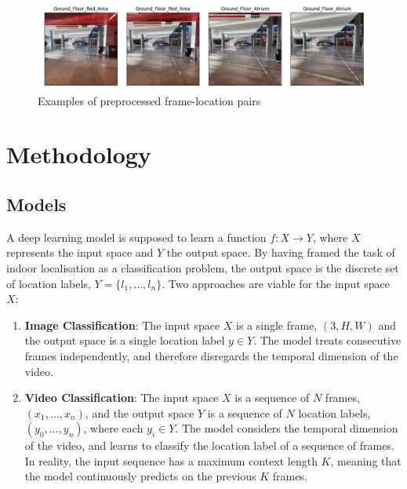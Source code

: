 \documentclass[a4paper]{article}
\begin{document}
  \begin{figure}[ht]
    \centering
    \includegraphics[width=\linewidth]{figures/data-example-batch.jpg}
    \caption{Examples of preprocessed frame-location pairs}
    \label{fig:preprocessed-data}
  \end{figure}

  
  

  \section{Methodology} %
  \label{sec:methodology}


  \subsection{Models} %
  \label{sub:models}

  A deep learning model is supposed to learn a function $f: X \rightarrow Y$,
  where $X$ represents the input space and $Y$ the output space. By having
  framed the task of indoor localisation as a classification problem, the output
  space is the discrete set of location labels, $Y = \{l_1, \ldots, l_n\}$.
  Two approaches are viable for the input space $X$:

  \begin{enumerate}

    \item \textbf{Image Classification}: The input space $X$ is a single frame,
      $(3, H, W)$ and the output space is a single location label $y \in Y$.
      The model treats consecutive frames independently, and
      therefore disregards the temporal dimension of the video.

    \item \textbf{Video Classification}: The input space $X$ is a sequence of
      $N$ frames, $(x_1, \ldots, x_n)$, and the output space $Y$ is a sequence
      of $N$ location labels, $(y_0, \ldots, y_n)$, where each $y_i \in Y$. The
      model considers the temporal dimension of the video, and learns to
      classify the location label of a sequence of frames. In reality, the input
      sequence has a maximum context length $K$, meaning that the model
      continuously predicts on the previous $K$ frames.

  \end{enumerate}
\end{document}
